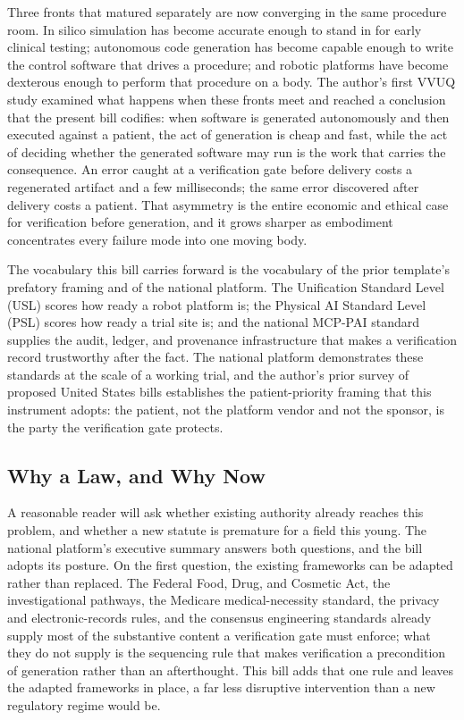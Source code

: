 Three fronts that matured separately are now converging in the same procedure
room. In silico simulation has become accurate enough to stand in for early
clinical testing; autonomous code generation has become capable enough to write
the control software that drives a procedure; and robotic platforms have become
dexterous enough to perform that procedure on a body. The author's first VVUQ
study \cite{kawchak2026vvuq01} examined what happens when these fronts meet and
reached a conclusion that the present bill codifies: when software is generated
autonomously and then executed against a patient, the act of generation is cheap
and fast, while the act of deciding whether the generated software may run is the
work that carries the consequence. An error caught at a verification gate before
delivery costs a regenerated artifact and a few milliseconds; the same error
discovered after delivery costs a patient. That asymmetry is the entire economic
and ethical case for verification before generation, and it grows sharper as
embodiment concentrates every failure mode into one moving body.

The vocabulary this bill carries forward is the vocabulary of the prior
template's prefatory framing and of the national platform. The Unification
Standard Level (USL) scores how ready a robot platform is; the Physical AI
Standard Level (PSL) scores how ready a trial site is; and the national MCP-PAI
standard supplies the audit, ledger, and provenance infrastructure that makes a
verification record trustworthy after the fact. The national platform
\cite{kawchak2026national} demonstrates these standards at the scale of a working
trial, and the author's prior survey of proposed United States bills
\cite{kawchak2026bills} establishes the patient-priority framing that this
instrument adopts: the patient, not the platform vendor and not the sponsor, is
the party the verification gate protects.

\subsection{Why a Law, and Why Now}

A reasonable reader will ask whether existing authority already reaches this
problem, and whether a new statute is premature for a field this young. The
national platform's executive summary answers both questions, and the bill adopts
its posture. On the first question, the existing frameworks can be adapted rather
than replaced. The Federal Food, Drug, and Cosmetic Act, the investigational
pathways, the Medicare medical-necessity standard, the privacy and
electronic-records rules, and the consensus engineering standards already supply
most of the substantive content a verification gate must enforce; what they do
not supply is the sequencing rule that makes verification a precondition of
generation rather than an afterthought. This bill adds that one rule and leaves
the adapted frameworks in place, a far less disruptive intervention than a new
regulatory regime would be.

